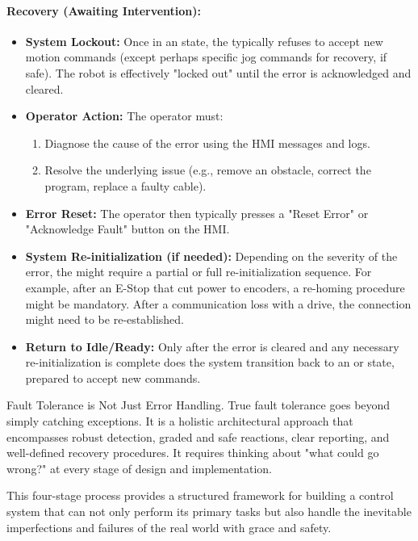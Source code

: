 \paragraph{Recovery (Awaiting Intervention):}
\begin{itemize}
    \item \textbf{System Lockout:} Once in an  state, the  typically refuses to accept new motion commands (except perhaps specific jog commands for recovery, if safe). The robot is effectively "locked out" until the error is acknowledged and cleared.
    \item \textbf{Operator Action:} The operator must:
        \begin{enumerate}
            \item Diagnose the cause of the error using the HMI messages and logs.
            \item Resolve the underlying issue (e.g., remove an obstacle, correct the program, replace a faulty cable).
        \end{enumerate}
    \item \textbf{Error Reset:} The operator then typically presses a "Reset Error" or "Acknowledge Fault" button on the HMI.
    \item \textbf{System Re-initialization (if needed):} Depending on the severity of the error, the  might require a partial or full re-initialization sequence. For example, after an E-Stop that cut power to encoders, a re-homing procedure might be mandatory. After a communication loss with a drive, the connection might need to be re-established.
    \item \textbf{Return to Idle/Ready:} Only after the error is cleared and any necessary re-initialization is complete does the system transition back to an  or  state, prepared to accept new commands.
\end{itemize}

\begin{principlebox}{Fault Tolerance is Not Just Error Handling.}
    True fault tolerance goes beyond simply catching exceptions. It is a holistic architectural approach that encompasses robust detection, graded and safe reactions, clear reporting, and well-defined recovery procedures. It requires thinking about "what could go wrong?" at every stage of design and implementation.
\end{principlebox}

This four-stage process provides a structured framework for building a control system that can not only perform its primary tasks but also handle the inevitable imperfections and failures of the real world with grace and safety.


